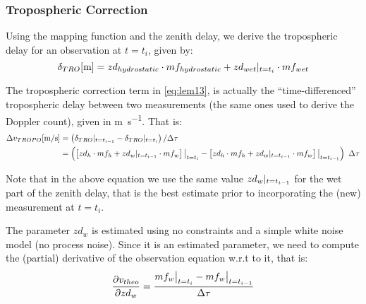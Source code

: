 \subsubsection{Tropospheric Correction}
Using the mapping function and the zenith delay, we derive the tropospheric 
delay for an observation at $t=t_i$, given by:
\begin{equation}
  \delta _{TRO} [\si{\m}] = zd_{hydrostatic} \cdot mf_{hydrostatic} + zd_{wet}\at{t=t_i} \cdot mf_{wet}
  \label{eq:tropo-delay}
\end{equation}

The tropospheric correction term in \ref{eq:lem13}, is actually the ``time-differenced'' 
tropospheric delay between two measurements (the same ones used to derive the 
Doppler count), given in \si{\m \per \s}. That is:
\begin{equation}
  \begin{aligned}
    \Delta v_{TROPO} [\si{\m \per \s}] 
      &= \left( \delta _{TRO} \at{t=t_{i-1}} - \delta _{TRO} \at{t=t_{i}} \right) / \Delta \tau\\
      &= \left( \left[ zd_{h} \cdot mf_{h} + zd_{w}\at{t=t_{i-1}} \cdot mf_{w} \right]\at[\big]{t=t_i} - 
        \left[ zd_{h} \cdot mf_{h} + zd_{w}\at{t=t_{i-1}} \cdot mf_{w} \right]\at[\big]{t=t_{i-1}} \right) \ \Delta \tau
    \label{eq:dtrop-diff}
  \end{aligned}
\end{equation}

Note that in the above equation we use the same value $zd_{w}|_{t=t_{i-1}}$ 
for the wet part of the zenith delay, that is the best estimate prior to 
incorporating the (new) measurement at $t=t_i$.

The parameter $zd_{w}$ is estimated using no constraints and a simple white 
noise model (no process noise). Since it is an estimated parameter, we need 
to compute the (partial) derivative of the observation equation w.r.t to it, 
that is:
\begin{equation}
  \frac{\partial v_{theo}}{\partial zd_{w}} = \frac{mf_{w}\at[\big]{t=t_i} 
    - mf_{w}\at[\big]{t=t_{i-1}}}{\Delta \tau}
  \label{eq:partials-zwd}
\end{equation}
\fi

